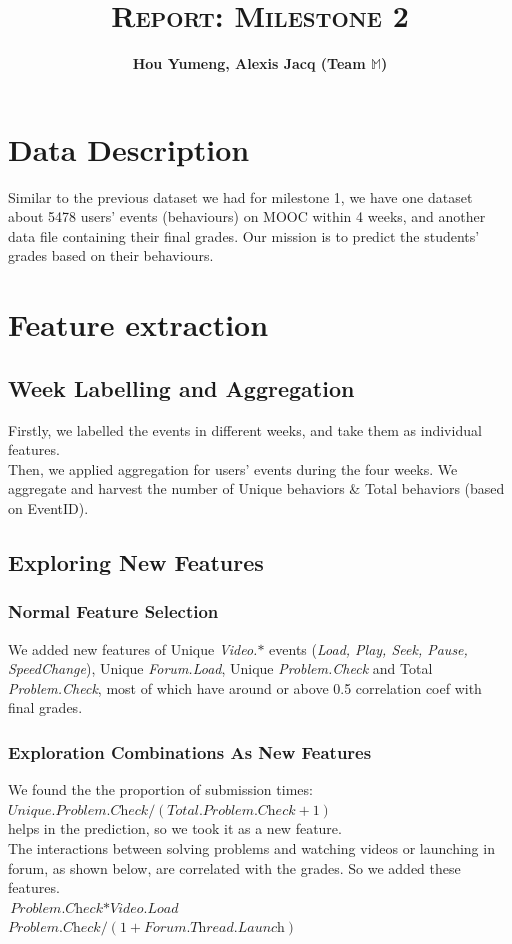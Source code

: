 \documentclass{article}
\title{\textbf{\textsc{Report: Milestone 2}}\vspace{4mm}}
\author{\textbf{Hou Yumeng, Alexis Jacq (Team $\mathbb{M}$)}\vspace{4mm}}
\begin{document}
\maketitle

\section{Data Description}
Similar to the previous dataset we had for milestone 1, we have one dataset about 5478 users’ events (behaviours) on MOOC within 4 weeks, and another data file containing their final grades. Our mission is to predict the students’ grades based on their behaviours.

\section{Feature extraction}

\subsection{Week Labelling and Aggregation}
Firstly, we labelled the events in different weeks, and take them as individual features. \\
Then, we applied aggregation for users’ events during the four weeks. We aggregate and harvest the number of Unique behaviors \& Total behaviors (based on EventID). 
\subsection{Exploring New Features}
\subsubsection{Normal Feature Selection}
We added new features of Unique \textit{Video.$*$} events (\textit{Load, Play, Seek, Pause, SpeedChange}), Unique \textit{Forum.Load}, Unique \textit{Problem.Check} and Total \textit{Problem.Check}, most of which have around or above 0.5 correlation coef with final grades.
\subsubsection{Exploration Combinations As New Features}
We found the the proportion of submission times: $\textit{Unique.Problem.Check} / (\textit{Total.Problem.Check} + 1)$\\ helps in the prediction, so we took it as a new feature.\\
The interactions between solving problems and watching videos or launching in forum, as shown below, are correlated with the grades. So we added these features. \\
$\textit{Problem.Check} *\textit{Video.Load}$  \\ $\textit{Problem.Check} / (1+\textit{Forum.Thread.Launch})$
\end{document}
